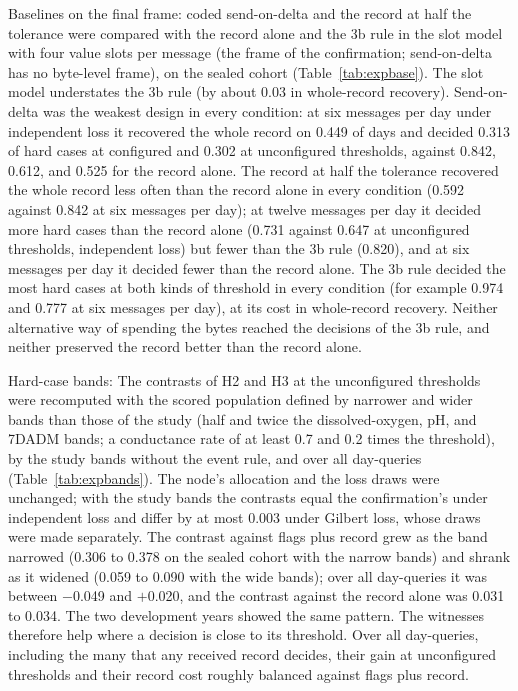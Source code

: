 Baselines on the final frame: coded send-on-delta and the record at half the tolerance were compared with the record alone and the 3b rule in the slot model with four value slots per message (the frame of the confirmation; send-on-delta has no byte-level frame), on the sealed cohort (Table~\ref{tab:expbase}). The slot model understates the 3b rule (by about 0.03 in whole-record recovery). Send-on-delta was the weakest design in every condition: at six messages per day under independent loss it recovered the whole record on 0.449 of days and decided 0.313 of hard cases at configured and 0.302 at unconfigured thresholds, against 0.842, 0.612, and 0.525 for the record alone. The record at half the tolerance recovered the whole record less often than the record alone in every condition (0.592 against 0.842 at six messages per day); at twelve messages per day it decided more hard cases than the record alone (0.731 against 0.647 at unconfigured thresholds, independent loss) but fewer than the 3b rule (0.820), and at six messages per day it decided fewer than the record alone. The 3b rule decided the most hard cases at both kinds of threshold in every condition (for example 0.974 and 0.777 at six messages per day), at its cost in whole-record recovery. Neither alternative way of spending the bytes reached the decisions of the 3b rule, and neither preserved the record better than the record alone.

Hard-case bands: The contrasts of H2 and H3 at the unconfigured thresholds were recomputed with the scored population defined by narrower and wider bands than those of the study (half and twice the dissolved-oxygen, pH, and 7DADM bands; a conductance rate of at least 0.7 and 0.2 times the threshold), by the study bands without the event rule, and over all day-queries (Table~\ref{tab:expbands}). The node's allocation and the loss draws were unchanged; with the study bands the contrasts equal the confirmation's under independent loss and differ by at most 0.003 under Gilbert loss, whose draws were made separately. The contrast against flags plus record grew as the band narrowed (0.306 to 0.378 on the sealed cohort with the narrow bands) and shrank as it widened (0.059 to 0.090 with the wide bands); over all day-queries it was between $-$0.049 and $+$0.020, and the contrast against the record alone was 0.031 to 0.034. The two development years showed the same pattern. The witnesses therefore help where a decision is close to its threshold. Over all day-queries, including the many that any received record decides, their gain at unconfigured thresholds and their record cost roughly balanced against flags plus record.
